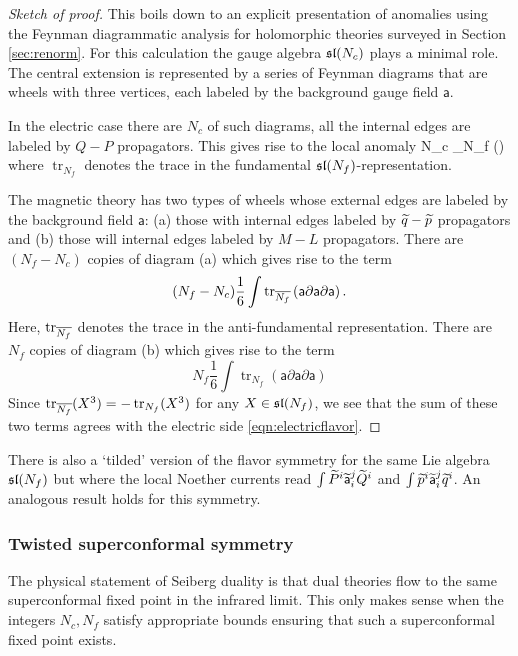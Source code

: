 \documentclass[11pt]{amsart}
\def\sfa{\mathsf{a}}
\renewcommand{\op}{\operatorname}
\begin{document}
\begin{proof}[Sketch of proof]
This boils down to an explicit presentation of anomalies using the Feynman diagrammatic analysis for holomorphic theories surveyed in Section \ref{sec:renorm}. 
For this calculation the gauge algebra $\sl(N_c)$ plays a minimal role. 
The central extension is represented by a series of Feynman diagrams that are wheels with three vertices, each labeled by the background gauge field $\sfa$.

In the electric case there are $N_c$ of such diagrams, all the internal edges are labeled by $Q-P$ propagators. 
This gives rise to the local anomaly
\beqn\label{eqn:electricflavor}
N_c  \int \op{tr}_{N_f} \left(\sfa \partial \sfa \partial \sfa\right) 
\eeqn
where $\op{tr}_{N_f}$ denotes the trace in the fundamental $\sl(N_f)$-representation.

The magnetic theory has two types of wheels whose external edges are labeled by the background field $\sfa$: (a) those with 
internal edges labeled by $\Tilde{q}-\Tilde{p}$ propagators and (b) those will internal edges labeled by $M-L$ propagators. 
There are $(N_f - N_c)$ copies of diagram (a) which gives rise to the term
\[
(N_f - N_c) \frac16 \int \op{tr}_{\Bar{N_f}} \left(\sfa \partial \sfa \partial \sfa\right) .
\]
Here, $\op{tr}_{\Bar{N_f}}$ denotes the trace in the anti-fundamental representation. 
There are $N_f$ copies of diagram (b) which gives rise to the term
\[
N_f \frac16\int \op{tr}_{N_f} \left(\sfa \partial \sfa \partial \sfa\right) 
\]
Since $\op{tr}_{\Bar{N_f}} (X^3) = - \op{tr}_{N_f} (X^3)$ for any $X \in \sl(N_f)$, we see that the sum of these two terms agrees with the electric side \eqref{eqn:electricflavor}.
\end{proof}

There is also a `tilded' version of the flavor symmetry for the same Lie algebra $\sl(N_f)$ but where the local Noether currents read $\int \Tilde{P}^i \Tilde{\sfa}_i^j \Tilde{Q}^i$ and $\int \Tilde{p}^i \Tilde{\sfa}_i^j \Tilde{q}^i$.
An analogous result holds for this symmetry.

\subsubsection{Twisted superconformal symmetry}

The physical statement of Seiberg duality is that dual theories flow to the same superconformal fixed point in the infrared limit. 
This only makes sense when the integers $N_c,N_f$ satisfy appropriate bounds ensuring that such a superconformal fixed point exists. 
\end{document}

